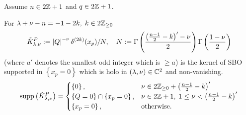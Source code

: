\documentclass[8pt,pdf,notes]{beamer}
\theoremstyle{mystyle}
\begin{document}
\begin{frame}
	Assume $n\in2\mathbb{Z}+1$ and $q\in2\mathbb{Z}+1$.
	\begin{theorem}[$G:=O(p+1,q+1),\;n:=p+q$]
		For $\lambda+\nu-n=-1-2k,\;k\in2\mathbb{Z}_{\ge0}$
		\[\tilde{K}_{\lambda,\nu}^P:=\left|Q\right|^{-\nu}\delta^{(2k)}(x_p)/N,\quad N:=\Gamma\left( 
			\frac{\left( \frac{n-1}{2}-k \right)'-\nu}{2}
			\right)
		\Gamma\left( \frac{1-\nu}{2} \right)\]
		(where $a'$ denotes the smallest odd integer which is $\ge a$)
		is the kernel of SBO supported in $\left\{ x_p=0 \right\}$ which is holo in $(\lambda,\nu)\in\mathbb{C}^2$ and
		non-vanishing. 
		\[
			\operatorname{supp}\left( \tilde{K}_{\lambda,\nu}^P \right)=\begin{cases}
				\left\{0 \right\},&\nu\in 2\mathbb{Z}_{\ge0}+\left( \frac{n-1}{2}-k \right)'\\
				\left\{ Q=0 \right\}\cap\left\{ x_p=0 \right\},&\nu\in2\mathbb{Z}+1,\;
				1\le\nu<\left( \frac{n-1}{2}-k \right)'\\
				\left\{ x_p=0 \right\},&\mbox{otherwise}.
			\end{cases}
		\]
	\end{theorem}
\end{frame}
\end{document}
